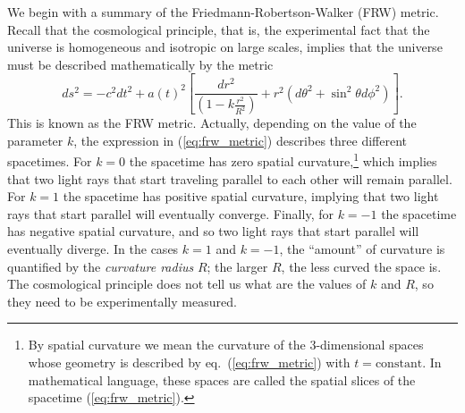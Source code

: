 \documentclass[11pt, a4paper,oneside,openright]{book}
\numberwithin{equation}{section}
\begin{document}
We begin with a summary of the Friedmann-Robertson-Walker (FRW) metric. Recall that the cosmological principle, that is, the experimental fact that the universe is homogeneous and isotropic on large scales, implies that the universe must be described mathematically by the metric
\begin{equation} \label{eq:frw_metric}
ds^2=-c^2dt^2+a(t)^2\left[\frac{dr^2}{\left(1-k\frac{r^2}{R^2}\right)}+r^2\left(d\theta^2+\sin^2\theta d\phi^2\right)\right].
\end{equation}
This is known as the FRW metric. Actually, depending on the value of the parameter $k$, the expression in (\ref{eq:frw_metric}) describes three different spacetimes. For $k=0$ the spacetime has zero spatial curvature,\footnote{By spatial curvature we mean the curvature of the 3-dimensional spaces whose geometry is described by eq.\ (\ref{eq:frw_metric}) with $t=\mathrm{constant}$. In mathematical language, these spaces are called the spatial slices of the spacetime (\ref{eq:frw_metric}).} which implies that two light rays that start traveling parallel to each other will remain parallel. For $k=1$ the spacetime has positive spatial curvature, implying that two light rays that start parallel will eventually converge. Finally, for $k=-1$ the spacetime has negative spatial curvature, and so two light rays that start parallel will eventually diverge. In the cases $k=1$ and $k=-1$, the ``amount'' of curvature is quantified by the {\it curvature radius} $R$; the larger $R$, the less curved the space is. The 
cosmological principle does not tell us what are the values of $k$ and $R$, so they need to be experimentally measured.
\end{document}
